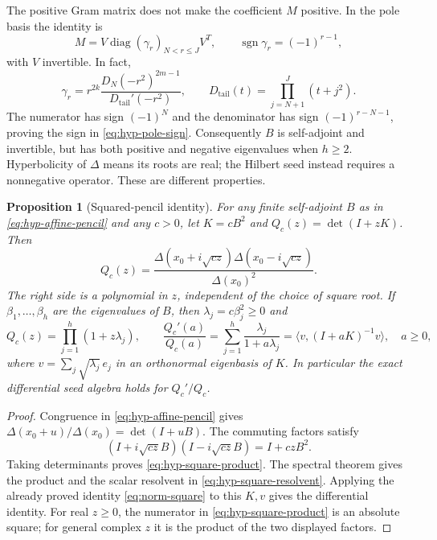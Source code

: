 \documentclass[11pt,a4paper]{article}
\numberwithin{equation}{section}
\newtheorem{proposition}[theorem]{Proposition}
\theoremstyle{definition}
\theoremstyle{remark}
\newcommand{\ip}[2]{\langle #1,#2\rangle}
\begin{document}
The positive Gram matrix does not make the coefficient $M$ positive.
In the pole basis the identity is
\begin{equation}\label{eq:hyp-pole-sign}
M=V\operatorname{diag}(\gamma_r)_{N<r\leq J}V^T,
\qquad \operatorname{sgn}\gamma_r=(-1)^{r-1},
\end{equation}
with $V$ invertible. In fact,
\[
\gamma_r=r^{2k}
 \frac{D_N(-r^2)^{2m-1}}{D_{\mathrm{tail}}'(-r^2)},
\qquad D_{\mathrm{tail}}(t)=\prod_{j=N+1}^J(t+j^2).
\]
The numerator has sign $(-1)^N$ and the denominator has sign
$(-1)^{r-N-1}$, proving the sign in \eqref{eq:hyp-pole-sign}.
Consequently $B$ is self-adjoint and invertible, but has both positive
and negative eigenvalues when $h\geq2$. Hyperbolicity of $\Delta$
means its roots are real; the Hilbert seed instead requires a
nonnegative operator. These are different properties.

\begin{proposition}[Squared-pencil identity]\label{prop:hyp-square}
For any finite self-adjoint $B$ as in \eqref{eq:hyp-affine-pencil}
and any $c>0$, let $K=cB^2$ and $Q_c(z)=\det(I+zK)$. Then
\begin{equation}\label{eq:hyp-square-product}
Q_c(z)=
\frac{\Delta(x_0+i\sqrt{cz})\Delta(x_0-i\sqrt{cz})}
     {\Delta(x_0)^2}.
\end{equation}
The right side is a polynomial in $z$, independent of the choice
of square root. If $\beta_1,\ldots,\beta_h$ are the eigenvalues of $B$,
then $\lambda_j=c\beta_j^2\geq0$ and
\begin{equation}\label{eq:hyp-square-resolvent}
Q_c(z)=\prod_{j=1}^h(1+z\lambda_j),\qquad
\frac{Q_c'(a)}{Q_c(a)}
=\sum_{j=1}^h\frac{\lambda_j}{1+a\lambda_j}
=\ip{v}{(I+aK)^{-1}v},\quad a\geq0,
\end{equation}
where $v=\sum_j\sqrt{\lambda_j}\,e_j$ in an orthonormal eigenbasis
of $K$. In particular the exact differential seed algebra holds for
$Q_c'/Q_c$.
\end{proposition}

\begin{proof}
Congruence in \eqref{eq:hyp-affine-pencil} gives
$\Delta(x_0+u)/\Delta(x_0)=\det(I+uB)$.
The commuting factors satisfy
\[
(I+i\sqrt{cz}B)(I-i\sqrt{cz}B)=I+czB^2.
\]
Taking determinants proves \eqref{eq:hyp-square-product}. The spectral
theorem gives the product and the scalar resolvent in
\eqref{eq:hyp-square-resolvent}. Applying the already proved identity
\eqref{eq:norm-square} to this $K,v$ gives the differential identity.
For real $z\geq0$, the numerator in \eqref{eq:hyp-square-product} is
an absolute square; for general complex $z$ it is the product of the
two displayed factors.
\end{proof}
\end{document}
